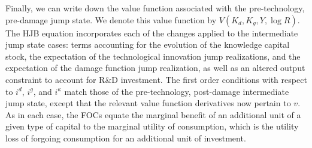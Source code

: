 \documentclass[12pt]{article}
\begin{document}
\begin{appendices}
Finally, we can write down the value function associated with the pre-technology, pre-damage jump state. We denote this value function by $V(K_{d},K_{g}, Y, \log R)$. The HJB equation incorporates each of the changes applied to the intermediate jump state cases: terms accounting for the evolution of the knowledge capital stock, the expectation of the technological innovation jump realizations, and the expectation of the damage function jump realization, as well as an altered output constraint to account for R\&D investment. The first order conditions with respect to $i^d$, $i^g$, and $i^{\kappa}$ match those of the pre-technology, post-damage intermediate jump state, except that the relevant value function derivatives now pertain to $v$. As in each case, the FOCs equate the marginal benefit of an additional unit of a given type of capital to the marginal utility of consumption, which is the utility loss of forgoing consumption for an additional unit of investment.

\end{appendices}

\newpage
\clearpage

\setcounter{page}{1}
\end{document}
